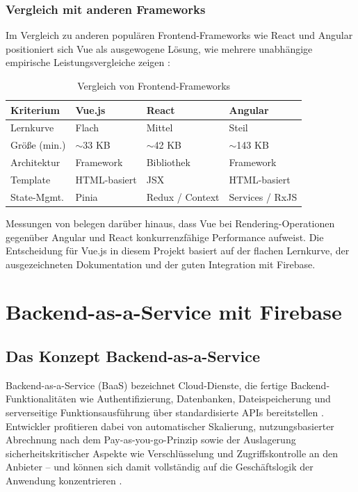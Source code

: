 \subsubsection{Vergleich mit anderen Frameworks}

Im Vergleich zu anderen populären Frontend-Frameworks wie React und Angular positioniert sich Vue als ausgewogene Lösung, wie mehrere unabhängige empirische Leistungsvergleiche zeigen \cite{piastou2023, bielak2022, emmanni2023}:

\begin{table}[H]
\centering
\begin{tabular}{llll}
\toprule
\textbf{Kriterium} & \textbf{Vue.js} & \textbf{React} & \textbf{Angular} \\
\midrule
Lernkurve    & Flach       & Mittel          & Steil \\
Größe (min.) & $\sim$33 KB & $\sim$42 KB     & $\sim$143 KB \\
Architektur  & Framework   & Bibliothek      & Framework \\
Template     & HTML-basiert & JSX            & HTML-basiert \\
State-Mgmt.  & Pinia       & Redux / Context & Services / RxJS \\
\bottomrule
\end{tabular}
\caption{Vergleich von Frontend-Frameworks}
\label{tab:framework-vergleich}
\end{table}

Messungen von \textcite{diniz2022} belegen darüber hinaus, dass Vue bei Rendering-Operationen gegenüber Angular und React konkurrenzfähige Performance aufweist. Die Entscheidung für Vue.js in diesem Projekt basiert auf der flachen Lernkurve, der ausgezeichneten Dokumentation und der guten Integration mit Firebase.

\section{Backend-as-a-Service mit Firebase}
\label{sec:firebase}

\subsection{Das Konzept Backend-as-a-Service}
\label{subsec:baas-konzept}

Backend-as-a-Service (BaaS) bezeichnet Cloud-Dienste, die fertige Backend-Funktionalitäten wie Authentifizierung, Datenbanken, Dateispeicherung und serverseitige Funktionsausführung über standardisierte APIs bereitstellen \cite{moroney2017, uunonen2023, kolesnikov2024}. Entwickler profitieren dabei von automatischer Skalierung, nutzungsbasierter Abrechnung nach dem Pay-as-you-go-Prinzip sowie der Auslagerung sicherheitskritischer Aspekte wie Verschlüsselung und Zugriffskontrolle an den Anbieter – und können sich damit vollständig auf die Geschäftslogik der Anwendung konzentrieren \cite{ayezabu2022}.


